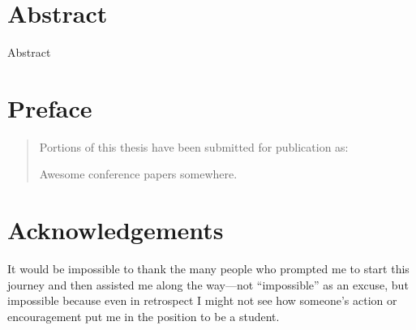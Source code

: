 \documentclass[phd-thesis.tex]{subfiles}
\begin{document}
\ifSubfilesClassLoaded{%
	\frontmatter
}{}

\chapter{Abstract}

Abstract

\chapter{Preface}

\begin{quote}

Portions of this thesis have been submitted for publication as:

Awesome conference papers somewhere.

\end{quote}

\chapter{Acknowledgements}

It would be impossible to thank the many people who prompted me to start this
journey and then assisted me along the way---not ``impossible'' as an excuse,
but impossible because even in retrospect I might not see how someone's action
or encouragement put me in the position to be a student.

\dedication{Dedication goes here.}

\tableofcontents

\listoftables

\listoffigures

\lstlistoflistings

\printabbreviations[title={List of Abbreviations}]
\end{document}

